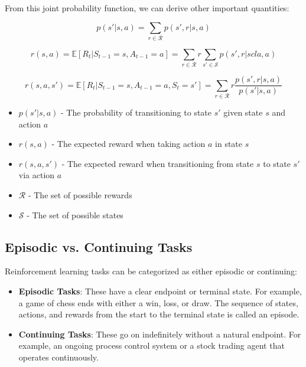\documentclass[12pt,a4paper]{article}
\begin{document}
From this joint probability function, we can derive other important quantities:

\begin{equation}
p(s'|s,a) = \sum_{r \in \mathcal{R}} p(s',r|s,a)
\end{equation}

\begin{equation}
r(s,a) = \mathbb{E}[R_t|S_{t-1}=s, A_{t-1}=a] = \sum_{r \in \mathcal{R}} r \sum_{s' \in \mathcal{S}} p(s',r|scla,a)
\end{equation}

\begin{equation}
r(s,a,s') = \mathbb{E}[R_t|S_{t-1}=s, A_{t-1}=a, S_t=s'] = \sum_{r \in \mathcal{R}} r \frac{p(s',r|s,a)}{p(s'|s,a)}
\end{equation}

\begin{tcolorbox}[title=Notation Overview]
\begin{itemize}
    \item $p(s'|s,a)$ - The probability of transitioning to state $s'$ given state $s$ and action $a$
    \item $r(s,a)$ - The expected reward when taking action $a$ in state $s$
    \item $r(s,a,s')$ - The expected reward when transitioning from state $s$ to state $s'$ via action $a$
    \item $\mathcal{R}$ - The set of possible rewards
    \item $\mathcal{S}$ - The set of possible states
\end{itemize}
\end{tcolorbox}

\subsection{Episodic vs. Continuing Tasks}

Reinforcement learning tasks can be categorized as either episodic or continuing:

\begin{itemize}
    \item \textbf{Episodic Tasks}: These have a clear endpoint or terminal state. For example, a game of chess ends with either a win, loss, or draw. The sequence of states, actions, and rewards from the start to the terminal state is called an episode.
    
    \item \textbf{Continuing Tasks}: These go on indefinitely without a natural endpoint. For example, an ongoing process control system or a stock trading agent that operates continuously.
\end{itemize}
\end{document}
